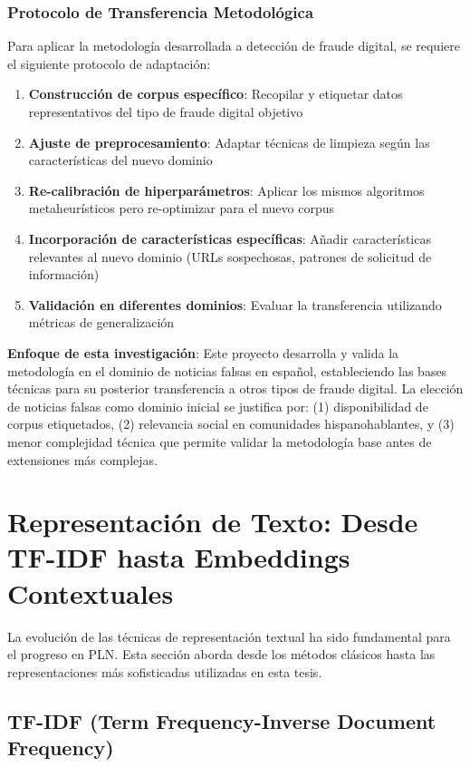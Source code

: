 \subsubsection{Protocolo de Transferencia Metodológica}

Para aplicar la metodología desarrollada a detección de fraude digital, se requiere el siguiente protocolo de adaptación:

\begin{enumerate}
    \item \textbf{Construcción de corpus específico}: Recopilar y etiquetar datos representativos del tipo de fraude digital objetivo
    \item \textbf{Ajuste de preprocesamiento}: Adaptar técnicas de limpieza según las características del nuevo dominio
    \item \textbf{Re-calibración de hiperparámetros}: Aplicar los mismos algoritmos metaheurísticos pero re-optimizar para el nuevo corpus
    \item \textbf{Incorporación de características específicas}: Añadir características relevantes al nuevo dominio (URLs sospechosas, patrones de solicitud de información)
    \item \textbf{Validación en diferentes dominios}: Evaluar la transferencia utilizando métricas de generalización
\end{enumerate}

\textbf{Enfoque de esta investigación}: Este proyecto desarrolla y valida la metodología en el dominio de noticias falsas en español, estableciendo las bases técnicas para su posterior transferencia a otros tipos de fraude digital. La elección de noticias falsas como dominio inicial se justifica por: (1) disponibilidad de corpus etiquetados, (2) relevancia social en comunidades hispanohablantes, y (3) menor complejidad técnica que permite validar la metodología base antes de extensiones más complejas.

\section{Representación de Texto: Desde TF-IDF hasta Embeddings Contextuales}
\label{sec:representacion_texto}

La evolución de las técnicas de representación textual ha sido fundamental para el progreso en PLN. Esta sección aborda desde los métodos clásicos hasta las representaciones más sofisticadas utilizadas en esta tesis.

\subsection{TF-IDF (Term Frequency-Inverse Document Frequency)}

